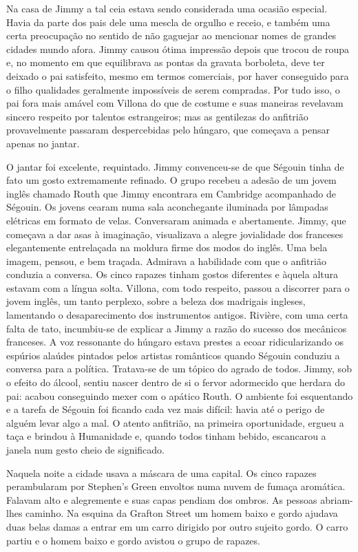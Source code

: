 Na casa de Jimmy a tal ceia estava sendo considerada uma ocasião especial.
Havia da parte dos pais dele uma mescla de orgulho e receio, e também uma certa
preocupação no sentido de não gaguejar ao mencionar nomes de grandes cidades
mundo afora.  Jimmy causou ótima impressão depois que trocou de roupa e, no
momento em que equilibrava as pontas da gravata borboleta, deve ter deixado o
pai satisfeito, mesmo em termos comerciais, por haver conseguido para o filho
qualidades geralmente impossíveis de serem compradas.  Por tudo isso, o pai
fora mais amável com Villona do que de costume e suas maneiras revelavam
sincero respeito por talentos estrangeiros; mas as gentilezas do anfitrião
provavelmente passaram despercebidas pelo húngaro, que começava a pensar apenas
no jantar.

O jantar foi excelente, requintado.  Jimmy convenceu-se de que Ségouin tinha de
fato um gosto extremamente refinado.  O grupo recebeu a adesão de um jovem
inglês chamado Routh que Jimmy encontrara em Cambridge acompanhado de Ségouin.
Os jovens cearam numa sala aconchegante iluminada por lâmpadas elétricas em
formato de velas.  Conversaram animada e abertamente.  Jimmy, que começava a
dar asas à imaginação, visualizava a alegre jovialidade dos franceses
elegantemente entrelaçada na moldura firme dos modos do inglês.  Uma bela
imagem, pensou, e bem traçada.  Admirava a habilidade com que o anfitrião
conduzia a conversa.  Os cinco rapazes tinham gostos diferentes e àquela altura
estavam com a língua solta.  Villona, com todo respeito, passou a discorrer
para o jovem inglês, um tanto perplexo, sobre a beleza dos madrigais ingleses,
lamentando o desaparecimento dos instrumentos antigos.  Rivière, com uma certa
falta de tato, incumbiu-se de explicar a Jimmy a razão do sucesso dos mecânicos
franceses.  A voz ressonante do húngaro estava prestes a ecoar ridicularizando
os espúrios alaúdes pintados pelos artistas românticos quando Ségouin conduziu
a conversa para a política.  Tratava-se de um tópico do agrado de todos.
Jimmy, sob o efeito do álcool, sentiu nascer dentro de si o fervor adormecido
que herdara do pai: acabou conseguindo mexer com o apático Routh.  O ambiente
foi esquentando e a tarefa de Ségouin foi ficando cada vez mais difícil: havia
até o perigo de alguém levar algo a mal.  O atento anfitrião, na primeira
oportunidade, ergueu a taça e brindou à Humanidade e, quando todos tinham
bebido, escancarou a janela num gesto cheio de significado.

Naquela noite a cidade usava a máscara de uma capital.  Os cinco rapazes
perambularam por Stephen’s Green envoltos numa nuvem de fumaça aromática.
Falavam alto e alegremente e suas capas pendiam dos ombros.  As pessoas
abriam-lhes caminho.  Na esquina da Grafton Street um homem baixo e gordo
ajudava duas belas damas a entrar em um carro dirigido por outro sujeito gordo.
O carro partiu e o homem baixo e gordo avistou o grupo de rapazes.

